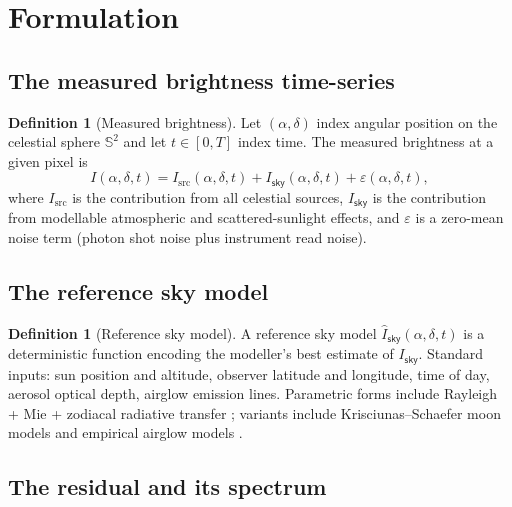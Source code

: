 \documentclass[11pt,twocolumn,a4paper]{article}
\theoremstyle{definition}
\newtheorem{definition}[theorem]{Definition}
\theoremstyle{remark}
\newcommand{\RA}{\alpha}
\newcommand{\Dec}{\delta}
\newcommand{\sky}{\mathsf{sky}}
\newcommand{\src}{\mathrm{src}}
\begin{document}
\section{Formulation}
\label{sec:formulation}

\subsection{The measured brightness time-series}

\begin{definition}[Measured brightness]
Let $(\RA, \Dec)$ index angular position on the celestial sphere
$\mathbb{S}^2$ and let $t \in [0, T]$ index time. The measured
brightness at a given pixel is
\begin{equation}
\label{eq:measurement}
I(\RA, \Dec, t) = I_\src(\RA, \Dec, t) + I_\sky(\RA, \Dec, t) + \varepsilon(\RA, \Dec, t),
\end{equation}
where $I_\src$ is the contribution from all celestial sources,
$I_\sky$ is the contribution from modellable atmospheric and
scattered-sunlight effects, and $\varepsilon$ is a zero-mean noise
term (photon shot noise plus instrument read noise).
\end{definition}

\subsection{The reference sky model}

\begin{definition}[Reference sky model]
A reference sky model $\widehat{I}_\sky(\RA, \Dec, t)$ is a
deterministic function encoding the modeller's best estimate of
$I_\sky$. Standard inputs: sun position and altitude, observer
latitude and longitude, time of day, aerosol optical depth, airglow
emission lines. Parametric forms include Rayleigh + Mie + zodiacal
radiative transfer \citep{noll2012}; variants include Krisciunas--Schaefer
moon models \citep{krisciunas1991} and empirical airglow models
\citep{patat2008}.
\end{definition}

\subsection{The residual and its spectrum}
\end{document}
